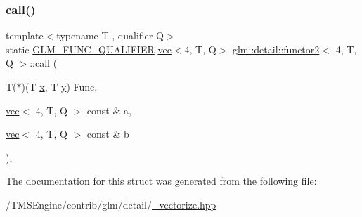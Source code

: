 \subsubsection{\texorpdfstring{call()}{call()}}
{\footnotesize\ttfamily template$<$typename T , qualifier Q$>$ \\
static \hyperlink{setup_8hpp_a33fdea6f91c5f834105f7415e2a64407}{G\+L\+M\+\_\+\+F\+U\+N\+C\+\_\+\+Q\+U\+A\+L\+I\+F\+I\+ER} \hyperlink{structglm_1_1vec}{vec}$<$4, T, Q$>$ \hyperlink{structglm_1_1detail_1_1functor2}{glm\+::detail\+::functor2}$<$ 4, T, Q $>$\+::call (\begin{DoxyParamCaption}\item[{T($\ast$)(T \hyperlink{_s_d_l__opengl_8h_ad0e63d0edcdbd3d79554076bf309fd47}{x}, T \hyperlink{_s_d_l__opengl_8h_a1675d9d7bb68e1657ff028643b4037e3}{y})}]{Func,  }\item[{\hyperlink{structglm_1_1vec}{vec}$<$ 4, T, Q $>$ const \&}]{a,  }\item[{\hyperlink{structglm_1_1vec}{vec}$<$ 4, T, Q $>$ const \&}]{b }\end{DoxyParamCaption})\hspace{0.3cm}{\ttfamily [inline]}, {\ttfamily [static]}}



The documentation for this struct was generated from the following file\+:\begin{DoxyCompactItemize}
\item 
/\+T\+M\+S\+Engine/contrib/glm/detail/\hyperlink{__vectorize_8hpp}{\+\_\+vectorize.\+hpp}\end{DoxyCompactItemize}
